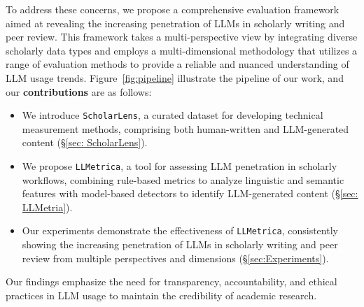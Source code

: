 To address these concerns, we propose a comprehensive evaluation framework aimed at revealing the increasing penetration of LLMs in scholarly writing and peer review. 
This framework takes a multi-perspective view by integrating diverse scholarly data types and employs a multi-dimensional methodology that utilizes a range of evaluation methods to provide a reliable and nuanced understanding of LLM usage trends. Figure~\ref{fig:pipeline} illustrate the pipeline of our work, and our \textbf{contributions} are as follows:

\begin{itemize}
    \item We introduce \texttt{ScholarLens}, a curated dataset for developing technical measurement methods, comprising both human-written and LLM-generated content (\S\ref{sec: ScholarLens}).
    \item We propose \texttt{LLMetrica}, a tool for assessing LLM penetration in scholarly workflows, combining rule-based metrics to analyze linguistic and semantic features with model-based detectors to identify LLM-generated content (\S\ref{sec: LLMetria}).
    \item Our experiments demonstrate the effectiveness of \texttt{LLMetrica}, consistently showing the increasing penetration of LLMs in scholarly writing and peer review from multiple perspectives and dimensions (\S\ref{sec:Experiments}).
\end{itemize}
Our findings emphasize the need for transparency, accountability, and ethical practices in LLM usage to maintain the credibility of academic research.





